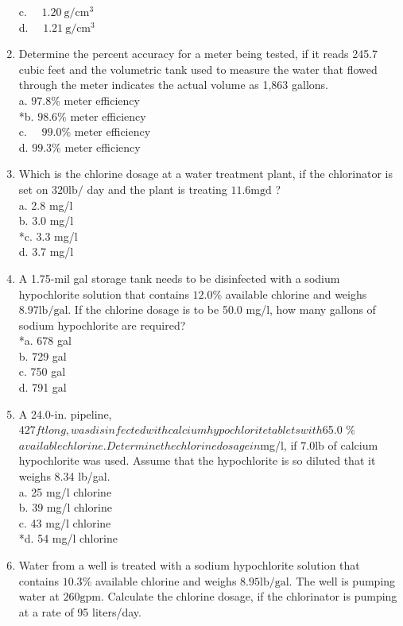 \begin{enumerate}
c. $\quad 1.20 \mathrm{~g} / \mathrm{cm}^{3}$\\
d. $\quad 1.21 \mathrm{~g} / \mathrm{cm}^{3}$\\
  \item Determine the percent accuracy for a meter being tested, if it reads 245.7 cubic feet and the volumetric tank used to measure the water that flowed through the meter indicates the actual volume as 1,863 gallons.\\
a. $97.8 \%$ meter efficiency\\
*b. $98.6 \%$ meter efficiency\\
c. $\quad 99.0 \%$ meter efficiency\\
d. $99.3 \%$ meter efficiency\\
  \item Which is the chlorine dosage at a water treatment plant, if the chlorinator is set on $320 \mathrm{lb} /$ day and the plant is treating $11.6 \mathrm{mgd}$ ?\\
a. 2.8 mg/l\\
b. 3.0 mg/l\\
*c. 3.3 mg/l\\
d. 3.7 mg/l\\
  \item A 1.75-mil gal storage tank needs to be disinfected with a sodium hypochlorite solution that contains $12.0 \%$ available chlorine and weighs $8.97 \mathrm{lb} / \mathrm{gal}$. If the chlorine dosage is to be 50.0 mg/l, how many gallons of sodium hypochlorite are required?\\
*a. 678 gal\\
b. 729 gal\\
c. 750 gal\\
d. 791 gal\\
  \item A 24.0-in. pipeline, $427 ft long, was disinfected with calcium hypochlorite tablets with $65.0 \%$ available chlorine. Determine the chlorine dosage in $mg/l, if $7.0 \mathrm{lb}$ of calcium hypochlorite was used. Assume that the hypochlorite is so diluted that it weighs 8.34 lb/gal.\\
a. 25 mg/l chlorine\\
b. 39 mg/l chlorine\\
c. 43 mg/l chlorine\\
*d. 54 mg/l chlorine \\
\item Water from a well is treated with a sodium hypochlorite solution that contains $10.3 \%$ available chlorine and weighs $8.95 \mathrm{lb} / \mathrm{gal}$. The well is pumping water at $260 \mathrm{gpm}$. Calculate the chlorine dosage, if the chlorinator is pumping at a rate of 95 liters/day.\\

\end{enumerate}
